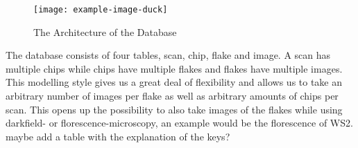 
\begin{figure}[h!]
    \centering
    \texttt{[image: example-image-duck]}
    \caption{The Architecture of the Database}
\end{figure}

The database consists of four tables, scan, chip, flake and image.
A scan has multiple chips while chips have multiple flakes and flakes have multiple images.
This modelling style gives us a great deal of flexibility and allows us to take an arbitrary number of images per flake as well as arbitrary amounts of chips per scan. This opens up the possibility to also take images of the flakes while using darkfield- or florescence-microscopy, an example would be the florescence of WS2.\\

maybe add a table with the explanation of the keys?